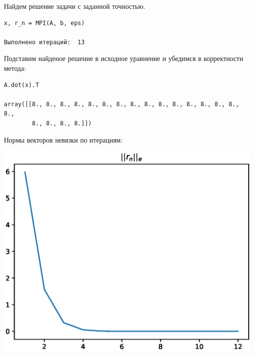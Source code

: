 Найдем решение задачи с заданной точностью.

\begin{verbatim}
x, r_n = MPI(A, b, eps)

Выполнено итераций:  13
\end{verbatim}

Подставим найденое решение в исходное уравнение и убедимся в корректности метода:
\begin{verbatim}
A.dot(x).T

array([[8., 8., 8., 8., 8., 8., 8., 8., 8., 8., 8., 8., 8., 8., 8., 8.,
        8., 8., 8., 8.]])
\end{verbatim}

Нормы векторов невязки по итерациям:

\includegraphics[width=15cm]{fig331.eps}
